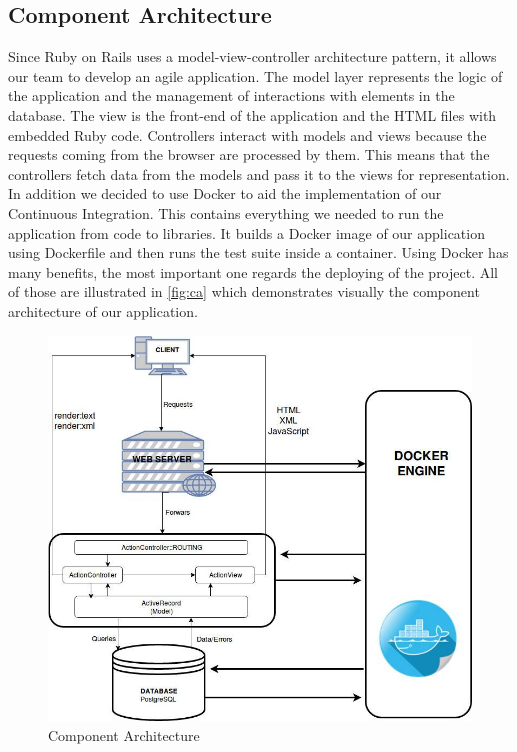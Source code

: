 \documentclass{l3proj}
\begin{document}
\subsection{Component Architecture}
\label{sec:component}

Since Ruby on Rails uses a model-view-controller architecture pattern, it allows our team to develop an agile application. The model layer represents the logic of the application and the management of interactions with elements in the database. The view is the front-end of the application and the HTML files with embedded Ruby code. Controllers interact with models and views because the requests coming from the browser are processed by them. This means that the controllers fetch data from the models and pass it to the views for representation.
In addition we decided to use Docker \cite{Docker} to aid the implementation of our Continuous Integration. This contains everything we needed to run the application from code to libraries. It builds a Docker image of our application using Dockerfile and then runs the test suite inside a container. Using Docker has many benefits, the most important one regards the deploying of the project.
All of those are illustrated in \autoref{fig:ca} which demonstrates visually the component architecture of our application.

\begin{figure}[h]
\centerline{\includegraphics[width=\textwidth, height=\textheight, keepaspectratio]{component.png}}
\caption{Component Architecture}
\label{fig:ca}
\end{figure}
\end{document}
